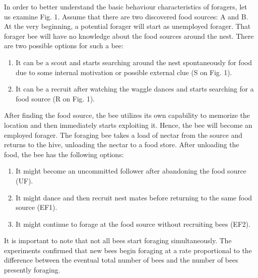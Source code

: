 \documentclass[pdftex,11pt]{article}
\begin{document}
In order to better understand the basic behaviour characteristics of foragers, let us examine Fig. 1. Assume that there are two discovered food sources: A and B. At the very beginning, a potential forager will start as unemployed forager. That forager bee will have no knowledge about the food sources around the nest. There are two possible options for such a bee:
\begin{enumerate}
\item It can be a scout and starts searching around the nest spontaneously for food due to some internal motivation or possible external clue (S on Fig. 1).
\item It can be a recruit after watching the waggle dances and starts searching for a food source (R on Fig. 1).
\end{enumerate}
After finding the food source, the bee utilizes its own capability to memorize the location and then immediately starts exploiting it. Hence, the bee will become an employed forager. The foraging bee takes a load of nectar from the source and returns to the hive, unloading the nectar to a food store. After unloading the food, the bee has the following options:
\begin{enumerate}
\item It might become an uncommitted follower after abandoning the food source (UF).
\item It might dance and then recruit nest mates before returning to the same food source (EF1).
\item It might continue to forage at the food source without recruiting bees (EF2).
\end{enumerate}
It is important to note that not all bees start foraging simultaneously. The experiments confirmed that new bees begin
foraging at a rate proportional to the difference between the eventual total number of bees and the number of bees presently
foraging.
\end{document}
